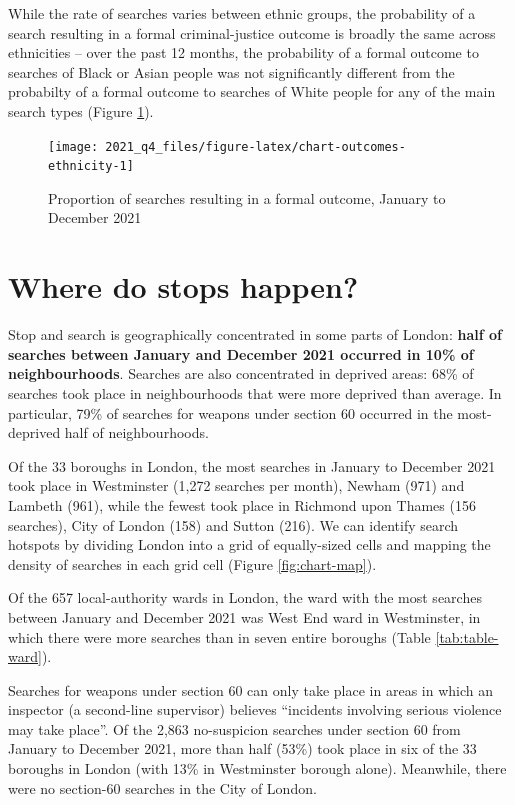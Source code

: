 \documentclass[
  a4paper,
  twoside, 11pt]{article}
\begin{document}
While the rate of searches varies between ethnic groups, the probability of a search resulting in a formal criminal-justice outcome is broadly the same across ethnicities -- over the past 12 months, the probability of a formal outcome to searches of Black or Asian people was not significantly different from the probabilty of a formal outcome to searches of White people for any of the main search types (Figure \ref{fig:chart-outcomes-ethnicity}).



\begin{figure}[tb]

{\centering \texttt{[image: 2021\_q4\_files/figure-latex/chart-outcomes-ethnicity-1]} 

}

\caption{Proportion of searches resulting in a formal outcome, January to December 2021}\label{fig:chart-outcomes-ethnicity}
\end{figure}

\hypertarget{where-do-stops-happen}{%
\section{Where do stops happen?}\label{where-do-stops-happen}}

Stop and search is geographically concentrated in some parts of London: \textbf{half of searches between January and December 2021 occurred in 10\% of neighbourhoods}. Searches are also concentrated in deprived areas: 68\% of searches took place in neighbourhoods that were more deprived than average. In particular, 79\% of searches for weapons under section 60 occurred in the most-deprived half of neighbourhoods.

Of the 33 boroughs in London, the most searches in January to December 2021 took place in Westminster (1,272 searches per month), Newham (971) and Lambeth (961), while the fewest took place in Richmond upon Thames (156 searches), City of London (158) and Sutton (216). We can identify search hotspots by dividing London into a grid of equally-sized cells and mapping the density of searches in each grid cell (Figure \ref{fig:chart-map}).

Of the 657 local-authority wards in London, the ward with the most searches between January and December 2021 was West End ward in Westminster, in which there were more searches than in seven entire boroughs (Table \ref{tab:table-ward}).

Searches for weapons under section 60 can only take place in areas in which an inspector (a second-line supervisor) believes ``incidents involving serious violence may take place''. Of the 2,863 no-suspicion searches under section 60 from January to December 2021, more than half (53\%) took place in six of the 33 boroughs in London (with 13\% in Westminster borough alone). Meanwhile, there were no section-60 searches in the City of London.
\end{document}
